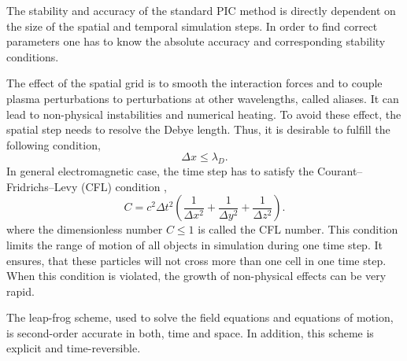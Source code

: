 The stability and accuracy of the standard PIC method is directly dependent on the size of the spatial and temporal simulation steps. In order to find correct parameters one has to know the absolute accuracy and corresponding stability conditions.

The effect of the spatial grid is to smooth the interaction forces and to couple plasma perturbations to perturbations at other wavelengths, called aliases. It can lead to non-physical instabilities and numerical heating. To avoid these effect, the spatial step needs to resolve the Debye length. Thus, it is desirable to fulfill the following condition,
\begin{equation}
\Delta x \leq \lambda_{D}.
\end{equation}
In general electromagnetic case, the time step has to satisfy the Courant--Fridrichs--Levy (CFL) condition \cite{jaroszynsky},
\begin{equation}
\label{3.2.4.1}
C = c^{2} \Delta t^{2} \left(\frac{1}{\Delta x^{2}} + \frac{1}{\Delta y^{2}} + \frac{1}{\Delta z^{2}}\right) .
\end{equation}
where the dimensionless number $ C \leq 1 $ is called the CFL number. This condition limits the range of motion of all objects in simulation during one time step. It ensures, that these particles will not cross more than one cell in one time step. When this condition is violated, the growth of non-physical effects can be very rapid. 

The leap-frog scheme, used to solve the field equations and equations of motion, is second-order accurate in both, time and space. In addition, this scheme is explicit and time-reversible.
